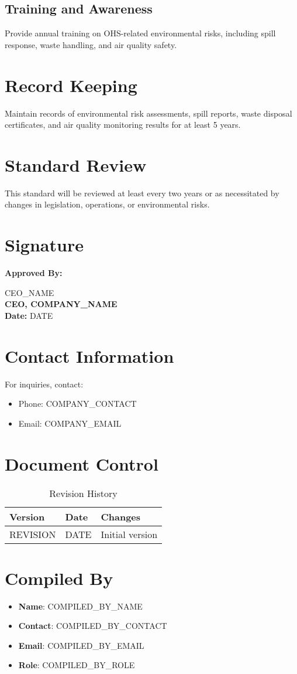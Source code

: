 \documentclass[12pt]{article}
\begin{document}
\subsection{Training and Awareness}
Provide annual training on OHS-related environmental risks, including spill response, waste handling, and air quality safety.

\section{Record Keeping}
Maintain records of environmental risk assessments, spill reports, waste disposal certificates, and air quality monitoring results for at least 5 years.

\section{Standard Review}
This standard will be reviewed at least every two years or as necessitated by changes in legislation, operations, or environmental risks.

\section{Signature}
\textbf{Approved By:}

{{CEO_NAME}}\\
\textbf{CEO, {{COMPANY_NAME}}}\\
\textbf{Date:} {{DATE}}

\section{Contact Information}
For inquiries, contact:
\begin{itemize}
    \item Phone: {{COMPANY_CONTACT}}
    \item Email: {{COMPANY_EMAIL}}
\end{itemize}

\section{Document Control}
\begin{table}[h]
    \centering
    \begin{tabular}{p{3cm}p{3cm}p{6cm}}
        \toprule
        \textbf{Version} & \textbf{Date} & \textbf{Changes} \\
        \midrule
        {{REVISION}} & {{DATE}} & Initial version \\
        \bottomrule
    \end{tabular}
    \caption{Revision History}
\end{table}

\section{Compiled By}
\begin{itemize}
    \item \textbf{Name}: {{COMPILED_BY_NAME}}
    \item \textbf{Contact}: {{COMPILED_BY_CONTACT}}
    \item \textbf{Email}: {{COMPILED_BY_EMAIL}}
    \item \textbf{Role}: {{COMPILED_BY_ROLE}}
\end{itemize}
\end{document}
